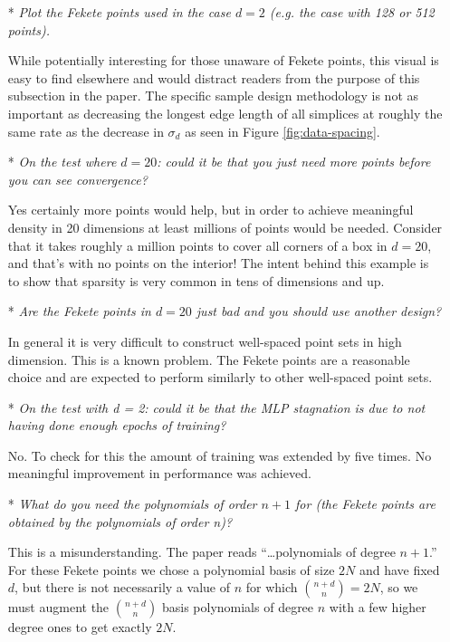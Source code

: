 \begin{itemize}[leftmargin=.5cm]
\item[*] {\it Plot the Fekete points used in the case $d = 2$ (e.g. the case with 128 or 512 points).}\vspace{.2cm}

While potentially interesting for those unaware of Fekete points, this visual is easy to find elsewhere and would distract readers from the purpose of this subsection in the paper. The specific sample design methodology is not as important as decreasing the longest edge length of all simplices at roughly the same rate as the decrease in $\sigma_d$ as seen in Figure \ref{fig:data-spacing}.

\newpage\setcounter{page}{0}\thispagestyle{empty}
\item[*] {\it On the test where $d = 20$: could it be that you just need more points before you can see convergence?}\vspace{.2cm}

Yes certainly more points would help, but in order to achieve meaningful density in 20 dimensions at least millions of points would be needed. Consider that it takes roughly a million points to cover all corners of a box in $d = 20$, and that's with no points on the interior! The intent behind this example is to show that sparsity is very common in tens of dimensions and up.

\item[*] {\it Are the Fekete points in $d = 20$ just bad and you should use another design?}\vspace{.2cm}

In general it is very difficult to construct well-spaced point sets in high dimension. This is a known problem. The Fekete points are a reasonable choice and are expected to perform similarly to other well-spaced point sets.

\item[*] {\it On the test with d = 2: could it be that the MLP stagnation is due to not having done enough epochs of training?}\vspace{.2cm}

No. To check for this the amount of training was extended by five times. No meaningful improvement in performance was achieved.

\item[*] {\it What do you need the polynomials of order $n+1$ for (the Fekete points are obtained by the polynomials of order n)?}\vspace{.2cm}

This is a misunderstanding. The paper reads ``\ldots polynomials of \color{red}degree \color{black} $n+1$.'' For these Fekete points we chose a polynomial basis of size $2N$ and have fixed $d$, but there is not necessarily a value of $n$ for which ${n + d \choose n} = 2N$, so we must augment the ${n+d \choose n}$ basis polynomials of degree $n$ with a few higher degree ones to get exactly $2N$.


\end{itemize}
